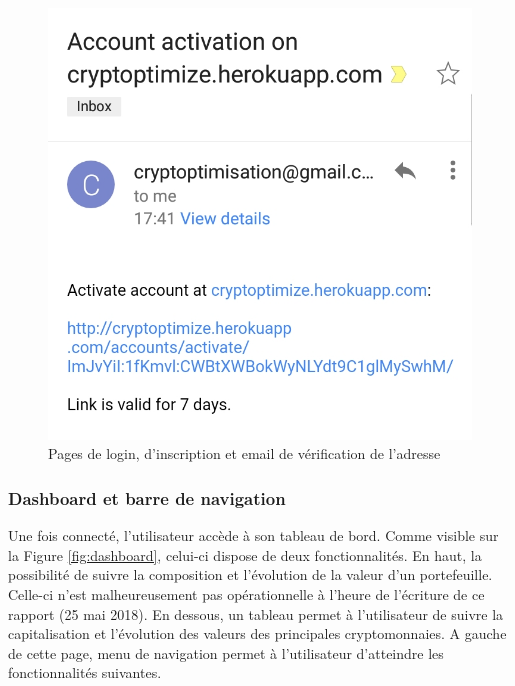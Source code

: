 \documentclass[a4paper, 10pt]{article}
\begin{document}
\begin{figure}[ht!]
\begin{center}
\begin{minipage}[b]{0.30\textwidth}
\end{minipage}\hfill
\begin{minipage}[b]{0.30\textwidth}
\includegraphics[scale=0.17]{images/mail.jpg}
\end{minipage}
\caption{Pages de login, d'inscription et email de vérification de l'adresse}
\label{fig:login}
\end{center}
\end{figure}

\subsubsection{Dashboard et barre de navigation}
\label{sec:developpement_pages_dashboard}

Une fois connecté, l'utilisateur accède à son tableau de bord. Comme visible sur la Figure \ref{fig:dashboard}, celui-ci dispose de deux fonctionnalités. En haut, la possibilité de suivre la composition et l'évolution de la valeur d'un portefeuille. Celle-ci n'est malheureusement pas opérationnelle à l'heure de l'écriture de ce rapport (25 mai 2018). En dessous, un tableau permet à l'utilisateur de suivre la capitalisation et l'évolution des valeurs des principales cryptomonnaies. A gauche de cette page, menu de navigation permet à l'utilisateur d'atteindre les fonctionnalités suivantes.
\end{document}
